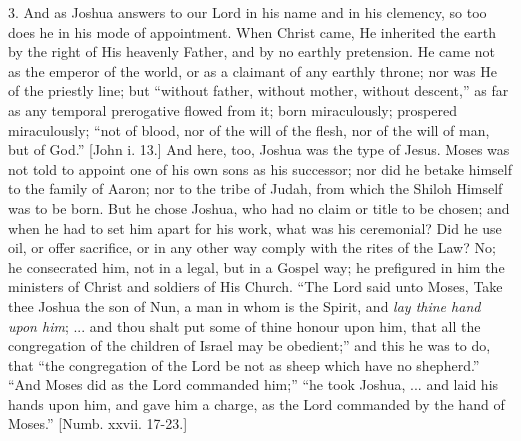 3. And as Joshua answers to our Lord in his name and in his
clemency, so too does he in his mode of appointment. When Christ came,
He inherited the earth by the right of His heavenly Father, and by no
earthly pretension. He came not as the emperor of the world, or as a
claimant of any earthly throne; nor was He of the priestly line; but
``without father, without mother, without descent,'' as far as
any temporal prerogative flowed from it; born miraculously; prospered
miraculously; ``not of blood, nor of the will of the flesh, nor
of
the will of man, but of God.'' [John i. 13.] And here, too, Joshua
was the type of Jesus. Moses was not told to appoint one of his own
sons as his successor; nor did he betake himself to the family of
Aaron; nor to the tribe of Judah, from which the Shiloh Himself was to
be born. But he chose Joshua, who had no claim or title to be chosen;
and when he had to set him apart for his work, what was his
ceremonial? Did he use oil, or offer sacrifice, or in any other way
comply with the rites of the Law? No; he consecrated him, not in a
legal, but in a Gospel way; he prefigured in him the ministers of
Christ and soldiers of His Church. ``The Lord said unto Moses,
Take thee Joshua the son of Nun, a man in whom is the Spirit, and \emph{lay
thine hand upon him}; ... and thou shalt put some of thine honour
upon him, that all the congregation of the children of Israel may be
obedient;'' and this he was to do, that ``the congregation of
the Lord be not as sheep which have no shepherd.'' ``And Moses
did as the Lord commanded him;'' ``he took Joshua, ... and
laid his hands upon him, and gave him a charge, as the Lord commanded
by the hand of Moses.'' [Numb. xxvii. 17-23.]

